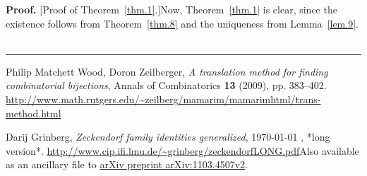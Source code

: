 \documentclass[numbers=enddot,12pt,final,onecolumn,notitlepage]{scrartcl}%
\numberwithin{exer}{section}
\theoremstyle{definition}
\newenvironment{proof}[1][Proof]{\noindent\textbf{#1.} }{\ \rule{0.5em}{0.5em}}
\begin{document}
\begin{proof}
[Proof of Theorem~\ref{thm.1}.]Now, Theorem~\ref{thm.1} is clear, since the
existence follows from Theorem~\ref{thm.8} and the uniqueness from
Lemma~\ref{lem.9}.
\end{proof}

\begin{thebibliography}{9}                                                                                                %


Philip Matchett Wood, Doron Zeilberger, \textit{A translation
method for finding combinatorial bijections}, Annals of Combinatorics
\textbf{13} (2009), pp. 383--402. \newline\url{http://www.math.rutgers.edu/~zeilberg/mamarim/mamarimhtml/trans-method.html}

Darij Grinberg, \textit{Zeckendorf family identities
generalized},
\today
, *long version*.\newline%
\url{http://www.cip.ifi.lmu.de/~grinberg/zeckendorfLONG.pdf}\newline Also
available as an ancillary file to
\href{https://arxiv.org/abs/1103.4507v2}{arXiv preprint arXiv:1103.4507v2}.
\end{thebibliography}
\end{document}
